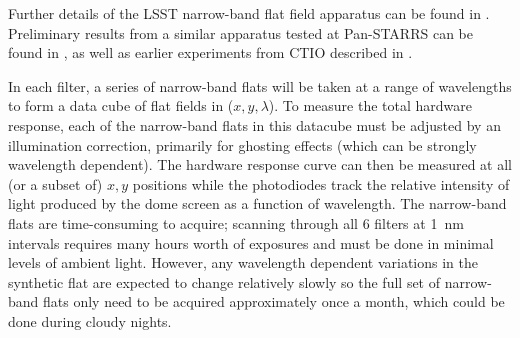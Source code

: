 \documentclass[12pt,preprint]{aastex}
\begin{document}
Further details of the LSST narrow-band flat field apparatus can be
found in \citet{Gressler2010}.  Preliminary results from a similar
apparatus tested at Pan-STARRS can be found in \citet{Stubbs2010a}, as
well as earlier experiments from CTIO described in
\citet{Stubbs2007a}.

In each filter, a series of narrow-band flats will be taken at a range
of wavelengths to form a data cube of flat fields in ($x,y,\lambda$).
To measure the total hardware response, each of the narrow-band flats
in this datacube must be adjusted by an illumination correction,
primarily for ghosting effects (which can be strongly wavelength
dependent). The hardware response curve can then be measured at all
(or a subset of) $x,y$ positions while the photodiodes track the
relative intensity of light produced by the dome screen as a function
of wavelength.  The narrow-band flats are time-consuming to acquire;
scanning through all 6 filters at 1~nm intervals requires many hours
worth of exposures and must be done in minimal levels of ambient
light. However, any wavelength dependent variations in the synthetic
flat are expected to change relatively slowly so the full set of
narrow-band flats only need to be acquired approximately once a month,
which could be done during cloudy nights.

\end{document}
